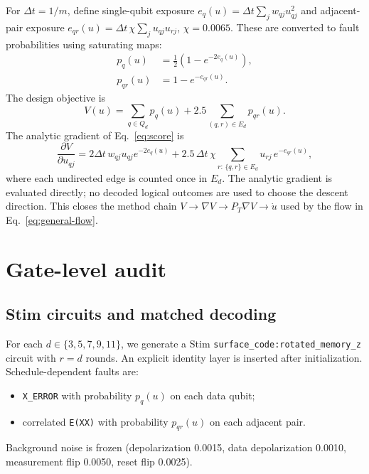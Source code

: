 \documentclass[11pt]{article}
\begin{document}
For \(\Delta t=1/m\), define single-qubit exposure \(e_q(u)=\Delta t\sum_j w_{qj}u_{qj}^2\) and adjacent-pair exposure \(e_{qr}(u)=\Delta t\,\chi\sum_j u_{qj}u_{rj}\), \(\chi=0.0065\). These are converted to fault probabilities using saturating maps:
\begin{align*}
  p_q(u)&=\frac{1}{2}(1-e^{-2e_q(u)}),\\
  p_{qr}(u)&=1-e^{-e_{qr}(u)}.
\end{align*}
The design objective is
\begin{equation}
  V(u)=\sum_{q\in Q_d}p_q(u)
       +2.5\sum_{(q,r)\in E_d}p_{qr}(u).
  \label{eq:score}
\end{equation}
The analytic gradient of Eq.~\eqref{eq:score} is
\begin{equation}
  \frac{\partial V}{\partial u_{qj}}
  =
  2\Delta t\,w_{qj}u_{qj}e^{-2e_q(u)}
  +
  2.5\,\Delta t\,\chi
  \sum_{r:\,\{q,r\}\in E_d}
  u_{rj}\,e^{-e_{qr}(u)},
  \label{eq:grad}
\end{equation}
where each undirected edge is counted once in \(E_d\). The analytic gradient is evaluated directly; no decoded logical outcomes are used to choose the descent direction. This closes the method chain \(V\longrightarrow\nabla V\longrightarrow P_T\nabla V\longrightarrow\dot u\) used by the flow in Eq.~\eqref{eq:general-flow}.

\section{Gate-level audit}

\subsection{Stim circuits and matched decoding}

For each \(d\in\{3,5,7,9,11\}\), we generate a Stim \texttt{surface\_code:rotated\_memory\_z} circuit with \(r=d\) rounds. An explicit identity layer is inserted after initialization. Schedule-dependent faults are:
\begin{itemize}
  \item \texttt{X\_ERROR} with probability \(p_q(u)\) on each data qubit;
  \item correlated \texttt{E(XX)} with probability \(p_{qr}(u)\) on each adjacent pair.
\end{itemize}
Background noise is frozen (depolarization 0.0015, data depolarization 0.0010, measurement flip 0.0050, reset flip 0.0025).
\end{document}
